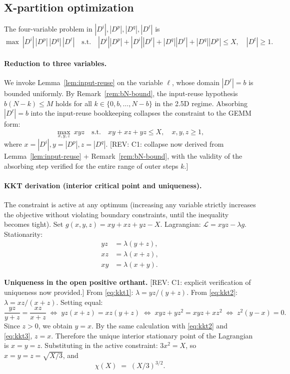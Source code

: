 \documentclass[11pt]{article}
\newcommand{\REV}[1]{\textcolor{blue!60!black}{\small\textsf{[REV: #1]}}}
\begin{document}
\subsection{X-partition optimization}
\label{sec:A2b}

The four-variable problem in $|D^i|, |D^p|, |D^q|, |D^\ell|$ is
\[
\max\ |D^i|\,|D^p|\,|D^q|\,|D^\ell|
\quad \text{s.t.}\quad
|D^i||D^p| + |D^i||D^\ell| + |D^q||D^\ell| + |D^q||D^p| \le X,
\quad |D^t| \ge 1.
\]

\paragraph{Reduction to three variables.}
We invoke Lemma~\ref{lem:input-reuse} on the variable $\ell$, whose
domain $|D^\ell| = b$ is bounded uniformly. By Remark~\ref{rem:bN-bound},
the input-reuse hypothesis $b(N-k) \le M$ holds for all
$k \in \{0,b,\ldots,N-b\}$ in the 2.5D regime. Absorbing
$|D^\ell| = b$ into the input-reuse bookkeeping collapses the
constraint to the GEMM form:
\[
\max_{x,y,z}\ xyz
\quad\text{s.t.}\quad
xy + xz + yz \le X,
\quad x,y,z \ge 1,
\]
where $x = |D^i|, y = |D^p|, z = |D^q|$.
\REV{C1: collapse now derived from Lemma~\ref{lem:input-reuse} +
Remark~\ref{rem:bN-bound}, with the validity of the absorbing step
verified for the entire range of outer steps $k$.}

\paragraph{KKT derivation (interior critical point and uniqueness).}
The constraint is active at any optimum (increasing any variable
strictly increases the objective without violating boundary
constraints, until the inequality becomes tight). Set
$g(x,y,z) = xy + xz + yz - X$. Lagrangian:
$\mathcal{L} = xyz - \lambda g$.
Stationarity:
\begin{align}
yz &= \lambda(y+z), \label{eq:kkt1} \\
xz &= \lambda(x+z), \label{eq:kkt2} \\
xy &= \lambda(x+y). \label{eq:kkt3}
\end{align}

\textbf{Uniqueness in the open positive orthant.}
\REV{C1: explicit verification of uniqueness now provided.}
From \eqref{eq:kkt1}: $\lambda = yz/(y+z)$. From \eqref{eq:kkt2}:
$\lambda = xz/(x+z)$. Setting equal:
\[
\frac{yz}{y+z} = \frac{xz}{x+z}
\;\Longleftrightarrow\;
yz(x+z) = xz(y+z)
\;\Longleftrightarrow\;
xyz + yz^2 = xyz + xz^2
\;\Longleftrightarrow\;
z^2(y-x) = 0.
\]
Since $z > 0$, we obtain $y = x$. By the same calculation with
\eqref{eq:kkt2} and \eqref{eq:kkt3}, $z = x$. Therefore the unique
interior stationary point of the Lagrangian is $x = y = z$.
Substituting in the active constraint: $3x^2 = X$, so
$x = y = z = \sqrt{X/3}$, and
\[
\boxed{\;\chi(X) \;=\; (X/3)^{3/2}.\;}
\]
\end{document}
